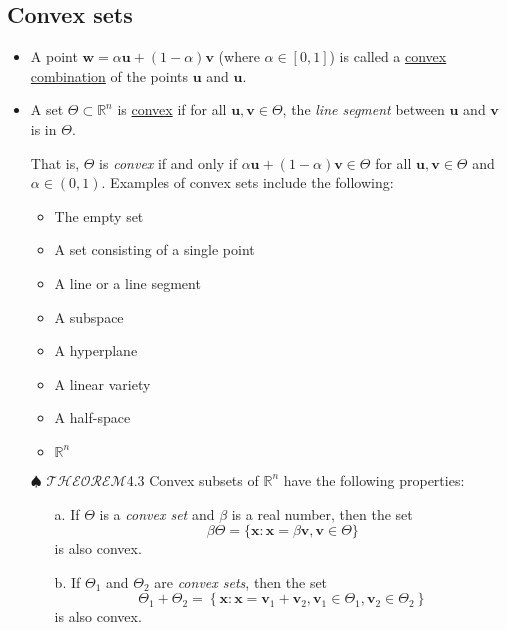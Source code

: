 \documentclass[12pt,thmsa]{article}
\begin{document}
\subsection{Convex sets}

\begin{itemize}
	\item A point \(\boldsymbol{w}=\alpha \boldsymbol{u}+(1-\alpha) \boldsymbol{v}\) (where \(\alpha \in[0,1]\)) is called a \underline{convex combination} of the points \(\boldsymbol{u}\) and \(\boldsymbol{u}\).


	\item A set \(\Theta \subset \mathbb{R}^{n}\) is \underline{convex} if for all \( \boldsymbol{u}, \boldsymbol{v} \in \Theta \), the \textit{line segment} between \(\boldsymbol{u}\) and \(\boldsymbol{v}\) is in \(\Theta \). 
	
	That is, \(\Theta\) is \textit{convex} if and only if \(\alpha \boldsymbol{u}+(1-\alpha) \boldsymbol{v} \in \Theta \) for all \(\boldsymbol{u}, \boldsymbol{v} \in \Theta\) and \(\alpha \in(0,1)\). Examples of convex sets include the following:
	\begin{multicols}{2}
		\begin{itemize}
			\item The empty set
			\item A set consisting of a single point
			\item A line or a line segment
			\item A subspace
			\item A hyperplane
			\item A linear variety
			\item A half-space
			\item \(\mathbb{R}^{n}\)
		\end{itemize}
	\end{multicols}

	\item[\(\spadesuit\)] \(\mathscr{THEOREM}\)4.3 Convex subsets of \(\mathbb{R}^{n}\) have the following properties:
	
	\begin{itemize}
		\item[a.] If \(\Theta\) is a \textit{convex set} and \(\beta\) is a real number, then the set
		\[
		\beta \Theta=\{\boldsymbol{x}: \boldsymbol{x}=\beta \boldsymbol{v}, \boldsymbol{v} \in \Theta\}
		\]is also convex.
		
		\item[b.] If \(\Theta_{1}\) and \(\Theta_{2}\) are \textit{convex sets}, then the set
		\[
		\Theta_{1}+\Theta_{2}=\left\{\boldsymbol{x}: \boldsymbol{x}=\boldsymbol{v}_{1}+\boldsymbol{v}_{2}, \boldsymbol{v}_{1} \in \Theta_{1}, \boldsymbol{v}_{2} \in \Theta_{2}\right\}
		\]is also convex.
		

\end{itemize}
\end{itemize}
\end{document}
